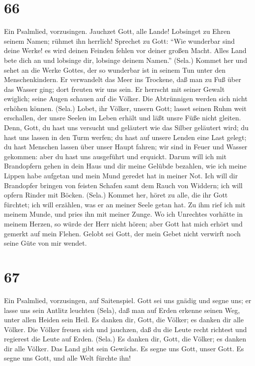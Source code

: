 \hypertarget{section-65}{%
\section{66}\label{section-65}}

 Ein Psalmlied, vorzusingen. Jauchzet Gott, alle Lande!
 Lobsinget zu Ehren seinem Namen; rühmet ihn herrlich!
 Sprechet zu Gott: ``Wie wunderbar sind deine Werke! es wird
deinen Feinden fehlen vor deiner großen Macht.  Alles Land
bete dich an und lobsinge dir, lobsinge deinem Namen.'' (Sela.)
 Kommet her und sehet an die Werke Gottes, der so wunderbar
ist in seinem Tun unter den Menschenkindern.  Er verwandelt
das Meer ins Trockene, daß man zu Fuß über das Wasser ging; dort freuten
wir uns sein.  Er herrscht mit seiner Gewalt ewiglich; seine
Augen schauen auf die Völker. Die Abtrünnigen werden sich nicht erhöhen
können. (Sela.)  Lobet, ihr Völker, unsern Gott; lasset
seinen Ruhm weit erschallen,  der unsre Seelen im Leben
erhält und läßt unsre Füße nicht gleiten.  Denn, Gott, du
hast uns versucht und geläutert wie das Silber geläutert wird;
 du hast uns lassen in den Turm werfen; du hast auf unsere
Lenden eine Last gelegt;  du hast Menschen lassen über
unser Haupt fahren; wir sind in Feuer und Wasser gekommen: aber du hast
uns ausgeführt und erquickt.  Darum will ich mit
Brandopfern gehen in dein Haus und dir meine Gelübde bezahlen,
 wie ich meine Lippen habe aufgetan und mein Mund geredet
hat in meiner Not.  Ich will dir Brandopfer bringen von
feisten Schafen samt dem Rauch von Widdern; ich will opfern Rinder mit
Böcken. (Sela.)  Kommet her, höret zu alle, die ihr Gott
fürchtet; ich will erzählen, was er an meiner Seele getan hat.
 Zu ihm rief ich mit meinem Munde, und pries ihn mit meiner
Zunge.  Wo ich Unrechtes vorhätte in meinem Herzen, so
würde der Herr nicht hören;  aber Gott hat mich erhört und
gemerkt auf mein Flehen.  Gelobt sei Gott, der mein Gebet
nicht verwirft noch seine Güte von mir wendet.

\hypertarget{section-66}{%
\section{67}\label{section-66}}

 Ein Psalmlied, vorzusingen, auf Saitenspiel. Gott sei uns
gnädig und segne uns; er lasse uns sein Antlitz leuchten (Sela),
 daß man auf Erden erkenne seinen Weg, unter allen Heiden
sein Heil.  Es danken dir, Gott, die Völker; es danken dir
alle Völker.  Die Völker freuen sich und jauchzen, daß du
die Leute recht richtest und regierest die Leute auf Erden. (Sela.)
 Es danken dir, Gott, die Völker; es danken dir alle Völker.
 Das Land gibt sein Gewächs. Es segne uns Gott, unser Gott.
 Es segne uns Gott, und alle Welt fürchte ihn!

